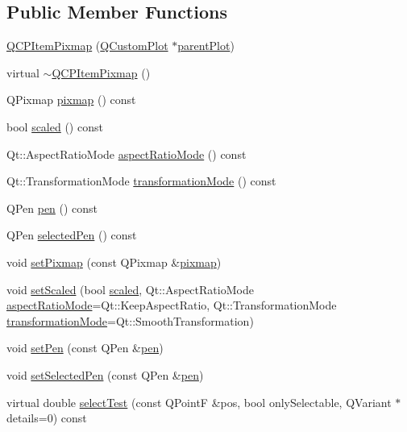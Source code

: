 \subsection*{Public Member Functions}
\begin{DoxyCompactItemize}
\item 
\hyperlink{classQCPItemPixmap_aa6de42a37261b21a5480e7da122345c3}{Q\+C\+P\+Item\+Pixmap} (\hyperlink{classQCustomPlot}{Q\+Custom\+Plot} $\ast$\hyperlink{classQCPLayerable_ab7e0e94461566093d36ffc0f5312b109}{parent\+Plot})
\item 
virtual \hyperlink{classQCPItemPixmap_a810cac6a409d963cda6ea2d3152f1fd0}{$\sim$\+Q\+C\+P\+Item\+Pixmap} ()
\item 
Q\+Pixmap \hyperlink{classQCPItemPixmap_a73dea89e0eb45127a2705e2c7991b8d8}{pixmap} () const 
\item 
bool \hyperlink{classQCPItemPixmap_a54026b89dff3c60376c2360f01b6fb83}{scaled} () const 
\item 
Qt\+::\+Aspect\+Ratio\+Mode \hyperlink{classQCPItemPixmap_ac5b95c097169e107a61eebbb7c77523c}{aspect\+Ratio\+Mode} () const 
\item 
Qt\+::\+Transformation\+Mode \hyperlink{classQCPItemPixmap_a1d4751a7b9588354fc8e726d891153f7}{transformation\+Mode} () const 
\item 
Q\+Pen \hyperlink{classQCPItemPixmap_ab2b821c80cfade589472e933b9c4361f}{pen} () const 
\item 
Q\+Pen \hyperlink{classQCPItemPixmap_af8e839d7c7b84e214608feda3caec2bc}{selected\+Pen} () const 
\item 
void \hyperlink{classQCPItemPixmap_a726b69ea4025edf48f9b29b6450548a7}{set\+Pixmap} (const Q\+Pixmap \&\hyperlink{classQCPItemPixmap_a73dea89e0eb45127a2705e2c7991b8d8}{pixmap})
\item 
void \hyperlink{classQCPItemPixmap_ab4d44529a1c6c8d37d0ea7560e042777}{set\+Scaled} (bool \hyperlink{classQCPItemPixmap_a54026b89dff3c60376c2360f01b6fb83}{scaled}, Qt\+::\+Aspect\+Ratio\+Mode \hyperlink{classQCPItemPixmap_ac5b95c097169e107a61eebbb7c77523c}{aspect\+Ratio\+Mode}=Qt\+::\+Keep\+Aspect\+Ratio, Qt\+::\+Transformation\+Mode \hyperlink{classQCPItemPixmap_a1d4751a7b9588354fc8e726d891153f7}{transformation\+Mode}=Qt\+::\+Smooth\+Transformation)
\item 
void \hyperlink{classQCPItemPixmap_acdade1305edb4b5cae14f97fd132065f}{set\+Pen} (const Q\+Pen \&\hyperlink{classQCPItemPixmap_ab2b821c80cfade589472e933b9c4361f}{pen})
\item 
void \hyperlink{classQCPItemPixmap_afc5e479e88e53740176ce77cb70dd67a}{set\+Selected\+Pen} (const Q\+Pen \&\hyperlink{classQCPItemPixmap_ab2b821c80cfade589472e933b9c4361f}{pen})
\item 
virtual double \hyperlink{classQCPItemPixmap_a9f8436aa141fa0fb504191c882c2f4d9}{select\+Test} (const Q\+PointF \&pos, bool only\+Selectable, Q\+Variant $\ast$details=0) const 
\end{DoxyCompactItemize}
